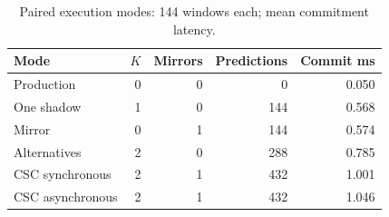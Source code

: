 \begin{table}[t]
\caption{Paired execution modes: 144 windows each; mean commitment latency.}
\label{tab:sumo-modes}
\centering
\begin{tabular}{lrrrr}
\toprule
Mode & $K$ & Mirrors & Predictions & Commit ms \\
\midrule
Production & 0 & 0 & 0 & 0.050 \\
One shadow & 1 & 0 & 144 & 0.568 \\
Mirror & 0 & 1 & 144 & 0.574 \\
Alternatives & 2 & 0 & 288 & 0.785 \\
CSC synchronous & 2 & 1 & 432 & 1.001 \\
CSC asynchronous & 2 & 1 & 432 & 1.046 \\
\bottomrule
\end{tabular}
\end{table}
